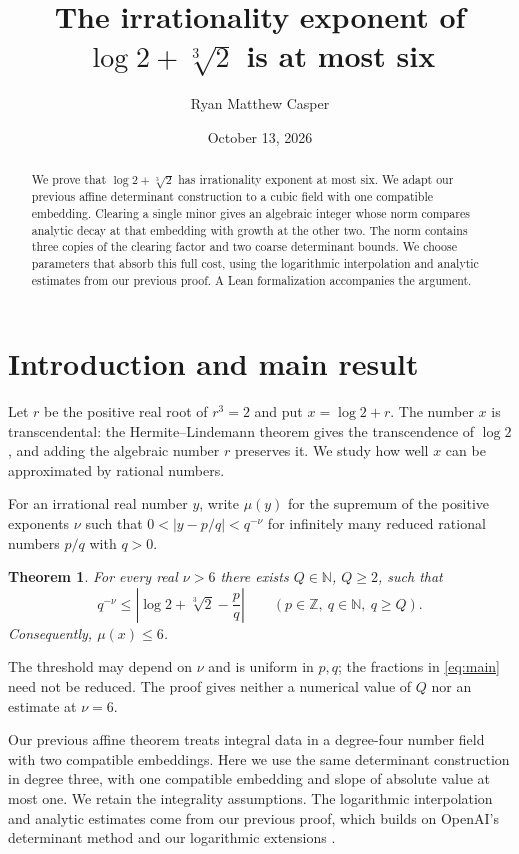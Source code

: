 \documentclass[11pt]{article}
\title{The irrationality exponent of\texorpdfstring{\\$\log2+\sqrt[3]{2}$}{ log 2 + cube root of 2} is at most six}
\author{Ryan Matthew Casper}
\date{October 13, 2026}
\newcommand{\Z}{\mathbb Z}
\newcommand{\N}{\mathbb N}
\newtheorem{theorem}{Theorem}[section]
\theoremstyle{remark}
\begin{document}
\maketitle
\begin{abstract}
We prove that $\log2+\sqrt[3]{2}$ has irrationality exponent at most six.
We adapt our previous affine determinant construction to a cubic field
with one compatible embedding. Clearing a single minor gives an
algebraic integer whose norm compares analytic decay at that embedding
with growth at the other two. The norm contains three copies of the
clearing factor and two coarse determinant bounds. We choose parameters that absorb
this full cost, using the logarithmic interpolation and analytic
estimates from our previous proof. A Lean formalization accompanies
the argument.
\end{abstract}

\section{Introduction and main result}
Let $r$ be the positive real root of $r^3=2$ and put $x=\log2+r$.
The number $x$ is transcendental: the Hermite--Lindemann theorem
\cite{lindemann} gives the transcendence of $\log2$, and adding the
algebraic number $r$ preserves it. We study how well $x$ can be
approximated by rational numbers.

For an irrational real number $y$, write $\mu(y)$ for the supremum of
the positive exponents $\nu$ such that
$0<|y-p/q|<q^{-\nu}$ for infinitely many reduced rational numbers
$p/q$ with $q>0$.

\begin{theorem}\label{thm:main}
For every real $\nu>6$ there exists $Q\in\N$, $Q\ge2$, such that
\begin{equation}\label{eq:main}
 q^{-\nu}\le\left|\log2+\sqrt[3]{2}-\frac pq\right|
 \qquad(p\in\Z,\ q\in\N,\ q\ge Q).
\end{equation}
Consequently, $\mu(x)\le6$.
\end{theorem}

The threshold may depend on $\nu$ and is uniform in $p,q$; the
fractions in \eqref{eq:main} need not be reduced. The proof gives
neither a numerical value of $Q$ nor an estimate at $\nu=6$.

Our previous affine theorem \cite[Theorem 3.1]{affine} treats integral
data in a degree-four number field with two compatible embeddings.
Here we use the same determinant construction in degree three, with
one compatible embedding and slope of absolute value at most one.
We retain the integrality assumptions. The logarithmic interpolation
and analytic estimates come from our previous proof, which builds on
OpenAI's determinant method \cite{openai} and our logarithmic
extensions \cite{quadratic}.
\end{document}
